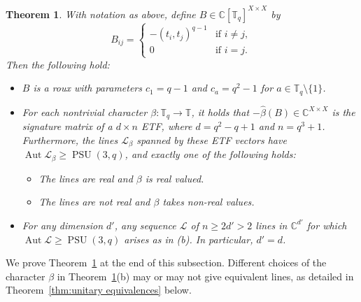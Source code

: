 \documentclass[11pt]{article}
\newtheorem{theorem}[theo]{Theorem}
\theoremstyle{definition}
\numberwithin{equation}{section}
\begin{document}
\begin{theorem}
\label{thm.updated unitary groups}
With notation as above, define $B\in\mathbb{C}[\mathbb{T}_q]^{X\times X}$ by
\[
B_{ij}=
\begin{cases}
-(t_i,t_j)^{q-1} & \text{if } i\neq j,\\
0 & \text{if }i=j.
\end{cases}
\]
Then the following hold:
\begin{itemize}
\item[(a)]
$B$ is a roux with parameters $c_1=q-1$ and $c_a=q^2-1$ for  $a\in\mathbb{T}_q\setminus\{1\}$.
\item[(b)]
For each nontrivial character $\beta\colon\mathbb{T}_q\to\mathbb{T}$, it holds that $-\hat\beta(B)\in\mathbb{C}^{X\times X}$ is the signature matrix of a $d\times n$ ETF, where $d=q^2-q+1$ and $n=q^3+1$.
Furthermore, the lines $\mathscr{L}_\beta$ spanned by these ETF vectors have $\operatorname{Aut}\mathscr{L}_\beta\geq\operatorname{PSU}(3,q)$, and exactly one of the following holds:
\begin{itemize}
\item[(i)]
The lines are real and $\beta$ is real valued.
\item[(ii)]
The lines are not real and $\beta$ takes non-real values.
\end{itemize}
\item[(c)]
For any dimension $d'$, any sequence $\mathscr{L}$ of $n\geq 2d'>2$ lines in $\mathbb{C}^{d'}$ for which $\operatorname{Aut}\mathscr{L}\geq\operatorname{PSU}(3,q)$ 
arises as in (b).
In particular, $d' = d$.
\end{itemize}
\end{theorem}


We prove Theorem~\ref{thm.updated unitary groups} at the end of this subsection.
Different choices of the character $\beta$ in Theorem~\ref{thm.updated unitary groups}(b) may or may not give equivalent lines, as detailed in Theorem~\ref{thm:unitary equivalences} below.
\end{document}
